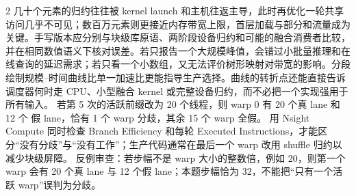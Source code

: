 \begin{solutionexercise}{2}
几十个元素的归约往往被 kernel launch 和主机往返主导，此时再优化一轮共享访问几乎不可见；数百万元素则更接近内存带宽上限，首层加载与部分和流量成为关键。手写版本应分别与块级库原语、两阶段设备归约和可能的融合消费者比较，并在相同数值语义下核对误差。若只报告一个大规模峰值，会错过小批量推理和在线查询的延迟需求；若只看一个小数组，又无法评价树形映射对带宽的影响。分段绘制规模--时间曲线比单一加速比更能指导生产选择。曲线的转折点还能直接告诉调度器何时走 CPU、小型融合 kernel 或完整设备归约，而不必把一个实现强用于所有输入。
\variantheading 若第 5 次的活跃前缀改为 20 个线程，则 warp 0 有 20 个真 lane 和 12 个
假 lane，恰有 1 个 warp 分歧，其余 15 个 warp 全假。
\practiceheading 用 Nsight Compute 同时检查 Branch Efficiency 和每轮 Executed
Instructions，才能区分“没有分歧”与“没有工作”；生产代码通常在最后一个 warp 改用
shuffle 归约以减少块级屏障。
反例审查：若步幅不是 warp 大小的整数倍，例如 20，则第一个 warp 会有 20 个真 lane 与
12 个假 lane；本题步幅恰为 32，不能把“只有一个活跃 warp”误判为分歧。
\end{solutionexercise}

